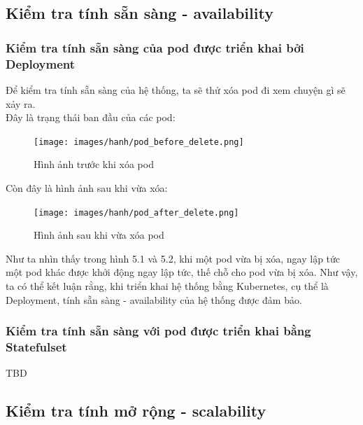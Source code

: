 \subsection{Kiểm tra tính sẵn sàng - availability}
\subsubsection{Kiểm tra tính sẵn sàng của pod được triển khai bởi Deployment}
\noindent Để kiểm tra tính sẵn sàng của hệ thống, ta sẽ thử xóa pod đi xem chuyện gì sẽ xảy ra.\\[0.5cm]
Đây là trạng thái ban đầu của các pod:
\begin{figure}[H]
  \begin{center}
  \texttt{[image: images/hanh/pod\_before\_delete.png]}
  \caption{Hình ảnh trước khi xóa pod}
  \end{center}
\end{figure}
Còn đây là hình ảnh sau khi vừa xóa:
\begin{figure}[H]
  \begin{center}
  \texttt{[image: images/hanh/pod\_after\_delete.png]}
  \caption{Hình ảnh sau khi vừa xóa pod}
  \end{center}
\end{figure}
Như ta nhìn thấy trong hình 5.1 và 5.2, khi một pod vừa bị xóa, ngay lập tức một pod khác được khởi động ngay lập tức, thế chỗ cho pod vừa bị xóa. Như vậy, ta có thể kết luận rằng, khi triển khai hệ thống bằng Kubernetes, cụ thể là Deployment, tính sẵn sàng - availability của hệ thống được đảm bảo.
\subsubsection{Kiểm tra tính sẵn sàng với pod được triển khai bằng Statefulset}
\noindent TBD
\subsection{Kiểm tra tính mở rộng - scalability}
